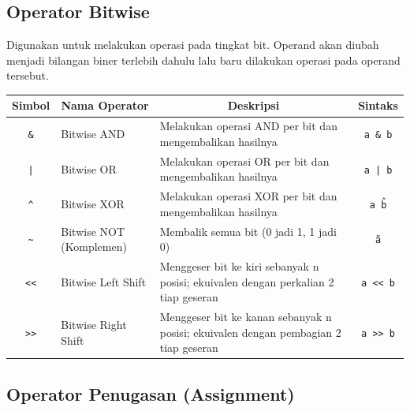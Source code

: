 \subsection{Operator Bitwise}

Digunakan untuk melakukan operasi pada tingkat bit.
Operand akan diubah menjadi bilangan biner terlebih dahulu lalu baru dilakukan operasi pada operand tersebut.
\begin{center}
	\begin{tabular}{|c|l|p{8cm}|c|}
		\hline
		\multicolumn{1}{|c|}{\textbf{Simbol}} &
		\multicolumn{1}{c|}{\textbf{Nama Operator}} &
		\multicolumn{1}{c|}{\textbf{Deskripsi}} &
		\multicolumn{1}{c|}{\textbf{Sintaks}} \\ \hline
		\texttt{\&}  & Bitwise AND              & Melakukan operasi AND per bit dan mengembalikan hasilnya & \texttt{a \& b} \\ \hline
		\texttt{|}   & Bitwise OR               & Melakukan operasi OR per bit dan mengembalikan hasilnya & \texttt{a | b} \\ \hline
		\texttt{\^}  & Bitwise XOR              & Melakukan operasi XOR per bit dan mengembalikan hasilnya & \texttt{a \^ b} \\ \hline
		\texttt{\~}  & Bitwise NOT (Komplemen)  & Membalik semua bit (0 jadi 1, 1 jadi 0) & \texttt{\~a} \\ \hline
		\texttt{<<}  & Bitwise Left Shift       & Menggeser bit ke kiri sebanyak n posisi; ekuivalen dengan perkalian 2 tiap geseran & \texttt{a << b} \\ \hline
		\texttt{>>}  & Bitwise Right Shift      & Menggeser bit ke kanan sebanyak n posisi; ekuivalen dengan pembagian 2 tiap geseran & \texttt{a >> b} \\ \hline
	\end{tabular}
\end{center}

\subsection{Operator Penugasan (Assignment)}

